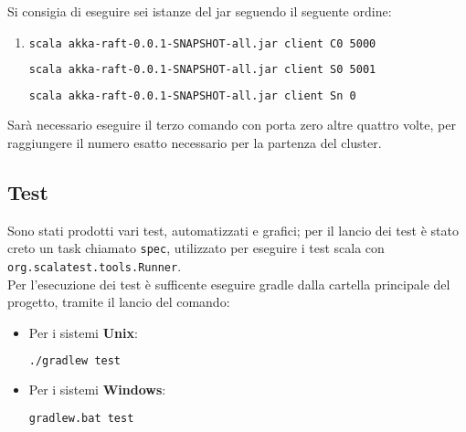 		Si consigia di eseguire sei istanze del jar seguendo il seguente ordine:
		  \begin{enumerate}
			  \item 
			  	\begin{lstlisting}[language=bash]
			  		scala akka-raft-0.0.1-SNAPSHOT-all.jar client C0 5000
			  	\end{lstlisting}
			  	\begin{lstlisting}[language=bash]
						scala akka-raft-0.0.1-SNAPSHOT-all.jar client S0 5001
					\end{lstlisting}
			  	\begin{lstlisting}[language=bash]
						scala akka-raft-0.0.1-SNAPSHOT-all.jar client Sn 0
					\end{lstlisting}			  
			\end{enumerate}	
		Sarà necessario eseguire il terzo comando con porta zero altre quattro volte, per raggiungere il numero esatto necessario per la partenza del cluster.
 
 \subsection{Test}
 Sono stati prodotti vari test, automatizzati e grafici; per il lancio dei test è stato creto un task chiamato \texttt{spec}, utilizzato per eseguire i test scala con \texttt{org.scalatest.tools.Runner}.\\
	Per l'esecuzione dei test è sufficente eseguire gradle dalla cartella principale del progetto, tramite il lancio del comando:
	\begin{itemize}
		\item Per i sistemi \textbf{Unix}: 
			\begin{lstlisting}[language=bash]
				./gradlew test
			\end{lstlisting}
		\item Per i sistemi \textbf{Windows}: 
			\begin{lstlisting}[language=bash]
				gradlew.bat test
			\end{lstlisting}
	\end{itemize}
